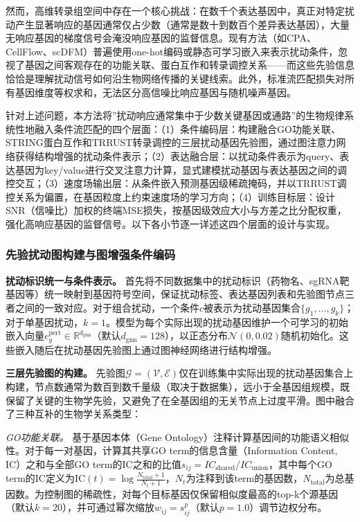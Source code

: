 然而，高维转录组空间中存在一个核心挑战：在数千个表达基因中，真正对特定扰动产生显著响应的基因通常仅占少数（通常是数十到数百个差异表达基因），大量无响应基因的梯度信号会淹没响应基因的监督信息。现有方法（如CPA、CellFlow、scDFM）普遍使用one-hot编码或静态可学习嵌入来表示扰动条件，忽视了基因之间客观存在的功能关联、蛋白互作和转录调控关系——而这些先验信息恰恰是理解扰动信号如何沿生物网络传播的关键线索。此外，标准流匹配损失对所有基因维度等权求和，无法区分高信噪比响应基因与随机噪声基因。

针对上述问题，本方法将”扰动响应通常集中于少数关键基因或通路”的生物规律系统性地融入条件流匹配的四个层面：（1）条件编码层：构建融合GO功能关联、STRING蛋白互作和TRRUST转录调控的三层扰动基因先验图，通过图注意力网络获得结构增强的扰动条件表示；（2）表达融合层：以扰动条件表示为query、表达基因为key/value进行交叉注意力计算，显式建模扰动基因与表达基因之间的调控交互；（3）速度场输出层：从条件嵌入预测基因级稀疏掩码，并以TRRUST调控关系为偏置，在基因粒度上约束速度场的学习方向；（4）训练目标层：设计SNR（信噪比）加权的终端MSE损失，按基因级效应大小与方差之比分配权重，强化高响应基因的监督信号。以下各小节逐一详述这四个层面的设计与实现。

\subsubsection{先验扰动图构建与图增强条件编码}

\textbf{扰动标识统一与条件表示。} 首先将不同数据集中的扰动标识（药物名、sgRNA靶基因等）统一映射到基因符号空间，保证扰动标签、表达基因列表和先验图节点三者之间的一致对应。对于组合扰动，一个条件$c$被表示为扰动基因集合$\{g_1,\ldots,g_k\}$；对于单基因扰动，$k=1$。模型为每个实际出现的扰动基因维护一个可学习的初始嵌入向量$e_g^{\mathrm{pert}}\in\mathbb{R}^{d_{\mathrm{gnn}}}$（默认$d_{\mathrm{gnn}}=128$），以正态分布$\mathcal{N}(0,0.02)$随机初始化。这些嵌入随后在扰动基因先验图上通过图神经网络进行结构增强。

\textbf{三层先验图的构建。} 先验图$\mathcal{G}=(\mathcal{V},\mathcal{E})$仅在训练集中实际出现的扰动基因集合上构建，节点数通常为数百到数千量级（取决于数据集），远小于全基因组规模，既保留了关键的生物学先验，又避免了在全基因组的无关节点上过度平滑。图中融合了三种互补的生物学关系类型：

\textit{GO功能关联。} 基于基因本体（Gene Ontology）注释计算基因间的功能语义相似性。对于每一对基因，计算其共享GO term的信息含量（Information Content, IC）之和与全部GO term的IC之和的比值$s_{ij}=IC_{\mathrm{shared}}/IC_{\mathrm{union}}$，其中每个GO term的IC定义为$\mathrm{IC}(t)=\log\frac{N_{\mathrm{total}}+1}{N_t+1}$，$N_t$为注释到该term的基因数，$N_{\mathrm{total}}$为总基因数。为控制图的稀疏性，对每个目标基因仅保留相似度最高的top-k个源基因（默认$k=20$），并可通过幂次缩放$w_{ij}=s_{ij}^{p}$（默认$p=1.0$）调节边权分布。


